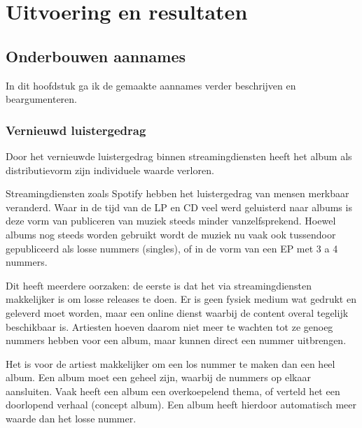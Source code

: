 \section{Uitvoering en resultaten}

\subsection{Onderbouwen aannames}

In dit hoofdstuk ga ik de gemaakte aannames verder beschrijven en beargumenteren.

\subsubsection*{Vernieuwd luistergedrag}

\begin{quotebox}
Door het vernieuwde luistergedrag binnen streamingdiensten heeft het album als distributievorm zijn individuele waarde verloren.
\end{quotebox}
Streamingdiensten zoals Spotify hebben het luistergedrag van mensen merkbaar veranderd. Waar in de tijd van de LP en CD veel werd geluisterd naar albums is deze vorm van publiceren van muziek steeds minder vanzelfsprekend. Hoewel albums nog steeds worden gebruikt wordt de muziek nu vaak ook tussendoor gepubliceerd als losse nummers (singles), of in de vorm van een EP met 3 a 4 nummers.

Dit heeft meerdere oorzaken: de eerste is dat het via streamingdiensten makkelijker is om losse releases te doen. Er is geen fysiek medium wat gedrukt en geleverd moet worden, maar een online dienst waarbij de content overal tegelijk beschikbaar is. Artiesten hoeven daarom niet meer te wachten tot ze genoeg nummers hebben voor een album, maar kunnen direct een nummer uitbrengen.

Het is voor de artiest makkelijker om een los nummer te maken dan een heel album. Een album moet een geheel zijn, waarbij de nummers op elkaar aansluiten. Vaak heeft een album een overkoepelend thema, of verteld het een doorlopend verhaal (concept album). Een album heeft hierdoor automatisch meer waarde dan het losse nummer. 

